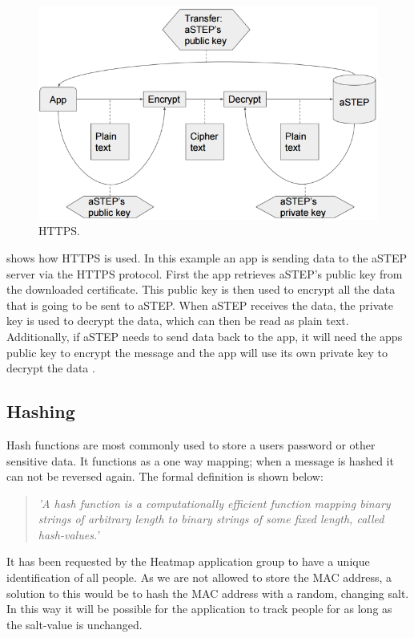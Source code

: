 \begin{figure}[ht]
	\begin{center}
		\includegraphics[scale=0.9]{graphics/encrypt_decrypt.png}
		\caption{HTTPS.}
		\label{fig:HTTPS}
	\end{center} 
\end{figure}

 shows how HTTPS is used. In this example an app is sending data to the aSTEP server via the HTTPS protocol. First the app retrieves aSTEP's public key from the downloaded certificate. This public key is then used to encrypt all the data that is going to be sent to aSTEP. When aSTEP receives the data, the private key is used to decrypt the data, which can then be read as plain text. Additionally, if aSTEP needs to send data back to the app, it will need the apps public key to encrypt the message and the app will use its own private key to decrypt the data \cite{HTTPS}.

\subsection*{Hashing}
Hash functions are most commonly used to store a users password or other sensitive data. It functions as a one way mapping; when a message is hashed it can not be reversed again. The formal definition is shown below:
\begin{quote}
\textit{'A hash function is a computationally efficient function mapping binary strings of arbitrary length to binary strings of some fixed length, called hash-values.' \cite{Hash_def}}
\end{quote}

It has been requested by the Heatmap application group to have a unique identification of all people. As we are not allowed to store the MAC address, a solution to this would be to hash the MAC address with a random, changing salt. In this way it will be possible for the application to track people for as long as the salt-value is unchanged.

